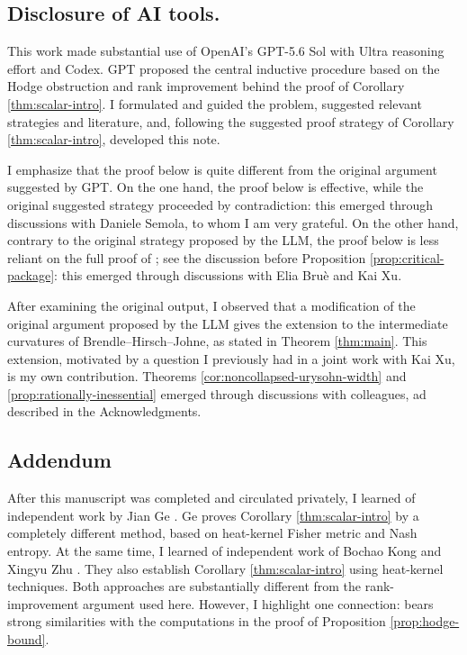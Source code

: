 \documentclass[11pt]{amsart}
\theoremstyle{definition}
\theoremstyle{remark}
\begin{document}
\subsection*{Disclosure of AI tools.}
This work made substantial use of OpenAI's GPT-5.6 Sol with Ultra reasoning effort and Codex. GPT proposed the central inductive procedure based on the Hodge
obstruction and rank improvement behind the proof of Corollary \ref{thm:scalar-intro}. I formulated and guided the
problem, suggested relevant strategies and literature, and, following the suggested proof strategy of Corollary \ref{thm:scalar-intro}, developed this note.

I emphasize that the proof below is quite different from the original argument suggested by GPT. On the one hand, the proof below is effective, while the original suggested strategy proceeded by contradiction: this emerged through discussions with Daniele Semola, to whom I am very grateful. On the other hand, contrary to the original strategy proposed by the LLM, the proof below is less reliant on the full proof of \cite[Theorem 5.1]{KapovitchWilking}; see the discussion before Proposition \ref{prop:critical-package}: this emerged through discussions with Elia Bruè and Kai Xu. 

After examining the original output, I observed that a modification
of the original argument proposed by the LLM gives the extension to the intermediate curvatures of
Brendle--Hirsch--Johne, as stated in Theorem \ref{thm:main}.  This extension, motivated by a question I
previously had in a joint work with Kai Xu, is my own contribution. Theorems \ref{cor:noncollapsed-urysohn-width} and \ref{prop:rationally-inessential} emerged through discussions with colleagues, ad described in the Acknowledgments.

\subsection*{Addendum}
After this manuscript was completed and circulated privately, I
learned of independent work by Jian Ge \cite{GeGromov}.  Ge proves
Corollary \ref{thm:scalar-intro} by a completely different method, based on
heat-kernel Fisher metric and Nash entropy.  At the same time, I learned of independent work of Bochao Kong and Xingyu Zhu \cite{KZ}. They also establish Corollary \ref{thm:scalar-intro} using heat-kernel techniques. Both approaches are substantially different from the rank-improvement argument used here.
However, I highlight one connection: \cite[Lemma 4.2]{KZ} bears strong similarities with the computations in the proof of Proposition \ref{prop:hodge-bound}.
\end{document}
